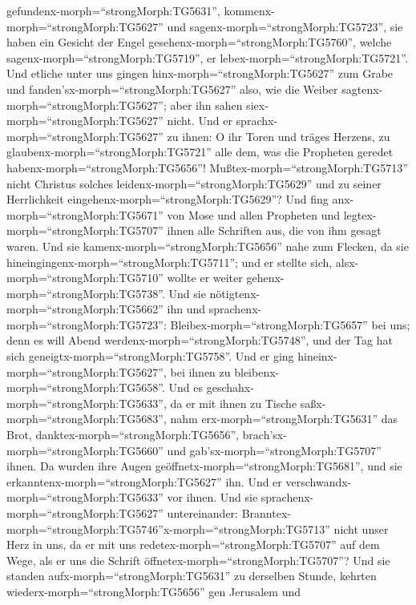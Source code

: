 gefundenx-morph=``strongMorph:TG5631'',
kommenx-morph=``strongMorph:TG5627'' und
sagenx-morph=``strongMorph:TG5723'', sie haben ein Gesicht der Engel
gesehenx-morph=``strongMorph:TG5760'', welche
sagenx-morph=``strongMorph:TG5719'', er
lebex-morph=``strongMorph:TG5721''.  Und etliche unter uns
gingen hinx-morph=``strongMorph:TG5627'' zum Grabe und
fanden'sx-morph=``strongMorph:TG5627'' also, wie die Weiber
sagtenx-morph=``strongMorph:TG5627''; aber ihn sahen
siex-morph=``strongMorph:TG5627'' nicht.  Und er
sprachx-morph=``strongMorph:TG5627'' zu ihnen: O ihr Toren und träges
Herzens, zu glaubenx-morph=``strongMorph:TG5721'' alle dem, was die
Propheten geredet habenx-morph=``strongMorph:TG5656''! 
Mußtex-morph=``strongMorph:TG5713'' nicht Christus solches
leidenx-morph=``strongMorph:TG5629'' und zu seiner Herrlichkeit
eingehenx-morph=``strongMorph:TG5629''?  Und fing
anx-morph=``strongMorph:TG5671'' von Mose und allen Propheten und
legtex-morph=``strongMorph:TG5707'' ihnen alle Schriften aus, die von
ihm gesagt waren.  Und sie
kamenx-morph=``strongMorph:TG5656'' nahe zum Flecken, da sie
hineingingenx-morph=``strongMorph:TG5711''; und er stellte sich,
alsx-morph=``strongMorph:TG5710'' wollte er weiter
gehenx-morph=``strongMorph:TG5738''.  Und sie
nötigtenx-morph=``strongMorph:TG5662'' ihn und
sprachenx-morph=``strongMorph:TG5723'':
Bleibex-morph=``strongMorph:TG5657'' bei uns; denn es will Abend
werdenx-morph=``strongMorph:TG5748'', und der Tag hat sich
geneigtx-morph=``strongMorph:TG5758''. Und er ging
hineinx-morph=``strongMorph:TG5627'', bei ihnen zu
bleibenx-morph=``strongMorph:TG5658''.  Und es
geschahx-morph=``strongMorph:TG5633'', da er mit ihnen zu Tische
saßx-morph=``strongMorph:TG5683'', nahm erx-morph=``strongMorph:TG5631''
das Brot, danktex-morph=``strongMorph:TG5656'',
brach'sx-morph=``strongMorph:TG5660'' und
gab'sx-morph=``strongMorph:TG5707'' ihnen.  Da wurden ihre
Augen geöffnetx-morph=``strongMorph:TG5681'', und sie
erkanntenx-morph=``strongMorph:TG5627'' ihn. Und er
verschwandx-morph=``strongMorph:TG5633'' vor ihnen.  Und
sie sprachenx-morph=``strongMorph:TG5627'' untereinander:
Branntex-morph=``strongMorph:TG5746''x-morph=``strongMorph:TG5713''
nicht unser Herz in uns, da er mit uns
redetex-morph=``strongMorph:TG5707'' auf dem Wege, als er uns die
Schrift öffnetex-morph=``strongMorph:TG5707''?  Und sie
standen aufx-morph=``strongMorph:TG5631'' zu derselben Stunde, kehrten
wiederx-morph=``strongMorph:TG5656'' gen Jerusalem und
